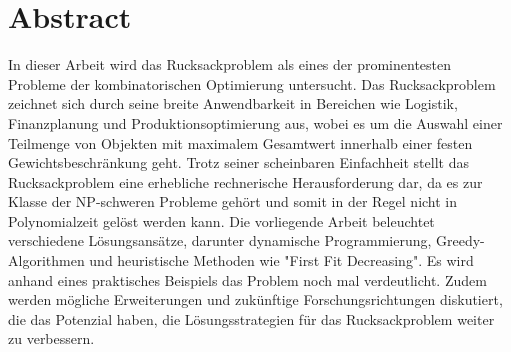 \documentclass[12pt]{report}
\begin{document}
\pagestyle{plain}
\fancyhead{}


\fancyhead[C]{\nouppercase\leftmark}

\renewcommand{\footrulewidth}{0.4pt} %


\renewcommand{\chaptermark}[1]{\markboth{#1}{}} 

\newpage
\chapter*{Abstract}
In dieser Arbeit wird das Rucksackproblem als eines der prominentesten Probleme der kombinatorischen Optimierung untersucht. Das Rucksackproblem zeichnet sich durch seine breite Anwendbarkeit in Bereichen wie Logistik, Finanzplanung und Produktionsoptimierung aus, wobei es um die Auswahl einer Teilmenge von Objekten mit maximalem Gesamtwert innerhalb einer festen Gewichtsbeschränkung geht. Trotz seiner scheinbaren Einfachheit stellt das Rucksackproblem eine erhebliche rechnerische Herausforderung dar, da es zur Klasse der NP-schweren Probleme gehört und somit in der Regel nicht in Polynomialzeit gelöst werden kann. Die vorliegende Arbeit beleuchtet verschiedene Lösungsansätze, darunter dynamische Programmierung, Greedy-Algorithmen und heuristische Methoden wie "First Fit Decreasing". Es wird anhand eines praktisches Beispiels das Problem noch mal verdeutlicht. Zudem werden mögliche Erweiterungen und zukünftige Forschungsrichtungen diskutiert, die das Potenzial haben, die Lösungsstrategien für das Rucksackproblem weiter zu verbessern.
\newpage

\end{document}
